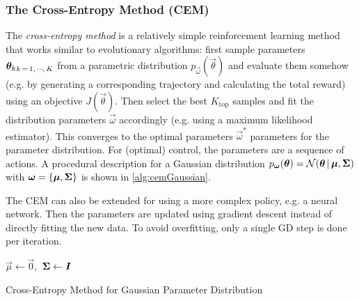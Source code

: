 			\subsubsection{The Cross-Entropy Method (CEM)}
				The \emph{cross-entropy method} is a relatively simple reinforcement learning method that works similar to evolutionary algorithms: first sample parameters \( {\bm{\theta}_k}_{k \,=\, 1,\,\cdots\!,\,K} \) from a parametric distribution \( p_{\vec{\omega}}(\vec{\theta}) \) and evaluate them somehow (e.g. by generating a corresponding trajectory and calculating the total reward) using an objective \( J(\vec{\theta}) \). Then select the best \( K_\mathrm{top} \) samples and fit the distribution parameters \(\vec{\omega}\) accordingly (e.g. using a maximum likelihood estimator). This converges to the optimal parameters \(\vec{\omega}^\ast\) parameters for the parameter distribution. For (optimal) control, the parameters are a sequence of actions. A procedural description for a Gaussian distribution \( p_{\bm{\omega}}(\bm{\theta}) = \mathcal{N}(\bm{\theta} \,\vert\, \bm{\mu}, \bm{\Sigma}) \) with \( \bm{\omega} = \{ \bm{\mu}, \bm{\Sigma} \} \) is shown in \autoref{alg:cemGaussian}.

				The CEM can also be extended for using a more complex policy, e.g. a neural network. Then the parameters are updated using gradient descent instead of directly fitting the new data. To avoid overfitting, only a single GD step is done per iteration.

				\begin{algorithm}  \DontPrintSemicolon
					\( \vec{\mu} \gets \vec{0} \),\, \( \bm{\Sigma} \gets \bm{I} \)
					\quad{}

					\caption{Cross-Entropy Method for Gaussian Parameter Distribution}
					\label{alg:cemGaussian}
				\end{algorithm}

